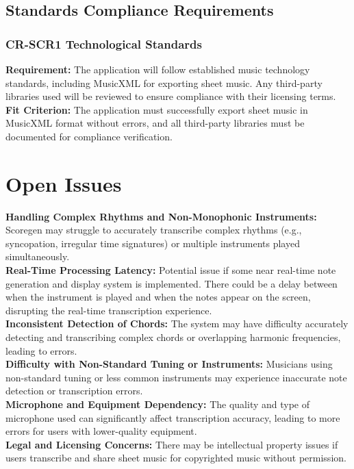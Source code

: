 \documentclass[12pt]{article}
\begin{document}
\subsection{Standards Compliance Requirements}

\subsubsection*{CR-SCR1 Technological Standards} \label{CR-SCR1}
\textbf{Requirement: }The application will follow established music technology standards, including MusicXML for exporting sheet music. Any third-party libraries used will be reviewed to ensure compliance with their licensing terms.
\textbf{Fit Criterion:} The application must successfully export sheet music in MusicXML format without errors, and all third-party libraries must be documented for compliance verification.



\section{Open Issues}

\textbf{Handling Complex Rhythms and Non-Monophonic Instruments:} Scoregen may struggle to accurately transcribe complex rhythms (e.g., syncopation, irregular time signatures) or multiple instruments played simultaneously. \\
\textbf{Real-Time Processing Latency:  }Potential issue if some near real-time note generation and display system is implemented. There could be a delay between when the instrument is played and when the notes appear on the screen, disrupting the real-time transcription experience. \\
\textbf{Inconsistent Detection of Chords:}  The system may have difficulty accurately detecting and transcribing complex chords or overlapping harmonic frequencies, leading to errors. \\
\textbf{Difficulty with Non-Standard Tuning or Instruments:} Musicians using non-standard tuning or less common instruments may experience inaccurate note detection or transcription errors. \\
\textbf{Microphone and Equipment Dependency:} The quality and type of microphone used can significantly affect transcription accuracy, leading to more errors for users with lower-quality equipment. \\
\textbf{Legal and Licensing Concerns:} There may be intellectual property issues if users transcribe and share sheet music for copyrighted music without permission.
\end{document}
